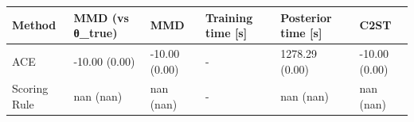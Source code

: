 \begin{tabular}{llllll}
\toprule
Method & MMD (vs θ_true) & MMD & Training time [s] & Posterior time [s] & C2ST \\
\midrule
ACE & -10.00 (0.00) & -10.00 (0.00) & - & 1278.29 (0.00) & -10.00 (0.00) \\
Scoring Rule & nan (nan) & nan (nan) & - & nan (nan) & nan (nan) \\
\bottomrule
\end{tabular}
